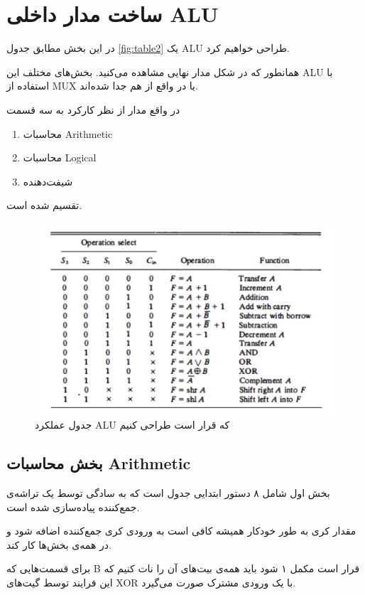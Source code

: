 \section{
ساخت مدار داخلی
ALU
}

در این بخش مطابق جدول
\eqref{fig:table2}
یک ALU
طراحی خواهیم کرد.

همانطور که در شکل مدار نهایی مشاهده می‌کنید.
بخش‌های مختلف این
ALU
با استفاده از
MUX
یا در واقع
از هم جدا شده‌اند.

در واقع مدار از نظر کارکرد به سه قسمت
\begin{enumerate}
    \item محاسبات
    Arithmetic
    \item محاسبات
    Logical
    \item شیفت‌دهنده
\end{enumerate}
تقسیم شده است.

\begin{figure}[h!]
    \centering
    \includegraphics[width=\textwidth]{part2/table2.png}
    \caption{
    جدول عملکرد
    ALU
    که قرار است طراحی کنیم
    }
    \label{fig:table2}
\end{figure}

\subsection{بخش محاسبات Arithmetic}
بخش اول شامل ۸ دستور ابتدایی جدول است که به سادگی توسط یک تراشه‌ی جمع‌کننده پیاده‌سازی شده است.

مقدار کری به طور خودکار همیشه کافی است به ورودی کری جمع‌کننده اضافه شود و در همه‌ی بخش‌ها کار کند.

برای قسمت‌هایی که
B
قرار است مکمل ۱ شود باید همه‌ی بیت‌های آن را نات کنیم که این فرایند توسط گیت‌های
XOR
با یک ورودی مشترک
صورت می‌گیرد.

